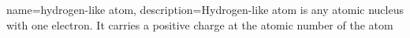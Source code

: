 {
    name=hydrogen-like atom,
    description={Hydrogen-like atom is any atomic nucleus with one electron. It carries a positive charge at the atomic number of the atom}
}
